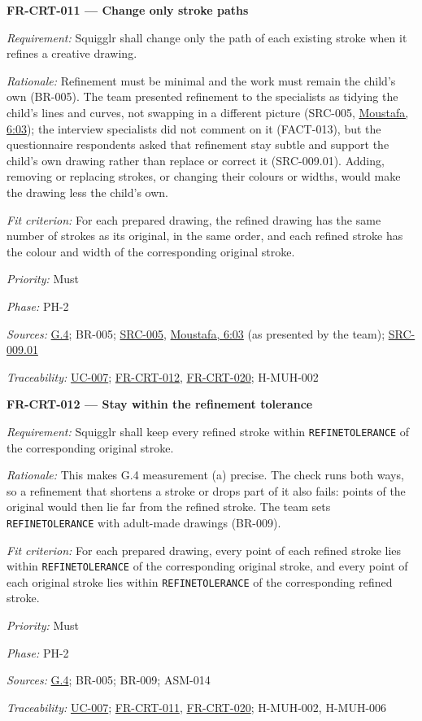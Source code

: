 \documentclass[12pt]{article}
\renewcommand{\_}{\textunderscore\allowbreak}%
\newcommand{\intlink}[3]{\hyperref[int:#1-#2]{#3}}
\newcommand{\intref}[2]{\intlink{#1}{#2}{#1, #2}}
\newcommand{\goalref}[1]{\hyperref[goal:#1]{G.#1}}
\newcommand{\ucref}[1]{\hyperref[uc:#1]{\mbox{UC-#1}}}
\newenvironment{srsrequirement}[2]{%
  \par\medskip\noindent\phantomsection\label{req:#1}%
  \textbf{#1 --- #2}\par\nobreak\smallskip }{\par\medskip}
\newcommand{\reqfield}[2]{\noindent\textit{#1:} #2\par}
\newcommand{\reqshall}[1]{\reqfield{Requirement}{#1}}
\newcommand{\reqrationale}[1]{\reqfield{Rationale}{#1}}
\newcommand{\reqfit}[1]{\reqfield{Fit criterion}{#1}}
\newcommand{\reqpriority}[1]{\reqfield{Priority}{#1}}
\newcommand{\reqphase}[1]{\reqfield{Phase}{#1}}
\newcommand{\reqsources}[1]{\reqfield{Sources}{#1}}
\newcommand{\reqtraces}[1]{\reqfield{Traceability}{#1}}
\newcommand{\reqref}[1]{\hyperref[req:#1]{#1}}
\newcommand{\srcref}[1]{\hyperref[src:#1]{SRC-#1}}
\providecommand{\ucref}[1]{\hyperref[uc:#1]{UC-#1}}
\begin{document}
\begin{srsrequirement}{FR-CRT-011}{Change only stroke paths}
  \reqshall{Squigglr shall change only the path of each existing stroke when it
refines a creative drawing.} \reqrationale{Refinement must be minimal and the
work must remain the child's own (BR-005). The team presented refinement to the
specialists as tidying the child's lines and curves, not swapping in a different
picture (SRC-005, \intref{Moustafa}{6:03}); the interview specialists did not
comment on it (FACT-013), but the questionnaire respondents asked that
refinement stay subtle and support the child's own drawing rather than replace
or correct it (SRC-009.01). Adding, removing or replacing strokes, or changing
their colours or widths, would make the drawing less the child's own.}
\reqfit{For each prepared drawing, the refined drawing has the same number of
strokes as its original, in the same order, and each refined stroke has the
colour and width of the corresponding original stroke.}
  \reqpriority{Must}
  \reqphase{PH-2}
  \reqsources{\goalref{4}; BR-005; \srcref{005}, \intref{Moustafa}{6:03} (as
presented by the team); \hyperref[src:009.01]{SRC-009.01}}
\reqtraces{\ucref{007}; \reqref{FR-CRT-012}, \reqref{FR-CRT-020}; H-MUH-002}
\end{srsrequirement}

\begin{sloppypar}
\begin{srsrequirement}{FR-CRT-012}{Stay within the refinement tolerance}
  \reqshall{Squigglr shall keep every refined stroke within
\texttt{REFINE\_\allowbreak TOLERANCE} of the corresponding original stroke.}
\reqrationale{This makes G.4 measurement (a) precise. The check runs both ways,
so a refinement that shortens a stroke or drops part of it also fails: points of
the original would then lie far from the refined stroke. The team sets
\texttt{REFINE\_\allowbreak TOLERANCE} with adult-made drawings (BR-009).}
\reqfit{For each prepared drawing, every point of each refined stroke lies
within \texttt{REFINE\_\allowbreak TOLERANCE} of the corresponding original
stroke, and every point of each original stroke lies within
\texttt{REFINE\_\allowbreak TOLERANCE} of the corresponding refined stroke.}
  \reqpriority{Must}
  \reqphase{PH-2}
  \reqsources{\goalref{4}; BR-005; BR-009; ASM-014} \reqtraces{\ucref{007};
  \reqref{FR-CRT-011}, \reqref{FR-CRT-020}; H-MUH-002, H-MUH-006}
\end{srsrequirement}
\end{sloppypar}
\end{document}

